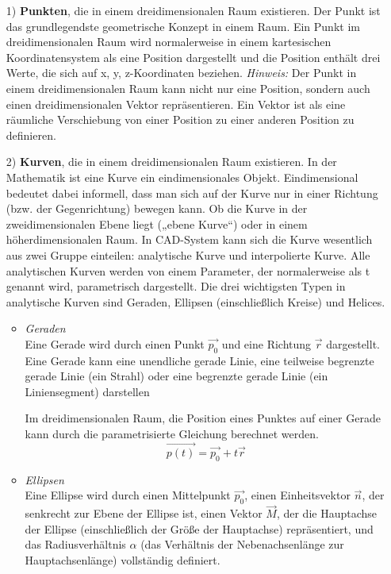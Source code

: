 \documentclass[14pt,a4paper,titlepage]{article}
\begin{document}
		\begin{itemize}
			\item[1)]
			\textbf{Punkten}, die in einem dreidimensionalen Raum existieren.
			\linebreak
			Der Punkt ist das grundlegendste geometrische Konzept in einem Raum. Ein Punkt im dreidimensionalen Raum wird normalerweise in einem kartesischen Koordinatensystem als eine Position dargestellt und die Position enthält drei Werte, die sich auf x, y, z-Koordinaten beziehen. 
			\bigbreak
			\emph{Hinweis:}
			\linebreak
			{\small Der Punkt in einem dreidimensionalen Raum kann nicht nur eine Position, sondern auch einen dreidimensionalen Vektor repräsentieren. Ein Vektor ist als eine räumliche Verschiebung von einer Position zu einer anderen Position zu definieren.}    
			\item[2)] 
			\textbf{Kurven}, die in einem dreidimensionalen Raum existieren.
			\linebreak
			In der Mathematik ist eine Kurve ein eindimensionales Objekt. Eindimensional bedeutet dabei informell, dass man sich auf der Kurve nur in einer Richtung (bzw. der Gegenrichtung) bewegen kann. Ob die Kurve in der zweidimensionalen Ebene liegt („ebene Kurve“) oder in einem höherdimensionalen Raum.\cite{kurve}
			\bigbreak
			In CAD-System kann sich die Kurve wesentlich aus zwei Gruppe einteilen: analytische Kurve und interpolierte Kurve.
			Alle analytischen Kurven werden von einem Parameter, der normalerweise als t genannt wird, parametrisch dargestellt. Die drei wichtigsten Typen in analytische Kurven sind Geraden, Ellipsen (einschließlich Kreise) und Helices.
			
			\begin{itemize}
				\item \emph{Geraden}
				\\
				Eine Gerade wird durch einen Punkt \(\vec{p_0}\) und eine Richtung \(\vec{r}\) dargestellt. Eine Gerade kann eine unendliche gerade Linie, eine teilweise begrenzte gerade Linie (ein Strahl) oder eine begrenzte gerade Linie (ein Liniensegment) darstellen
				
				\bigbreak
				
				Im dreidimensionalen Raum, die Position eines Punktes auf einer Gerade kann durch die parametrisierte Gleichung berechnet werden.
			    \[ \vec{p(t)} = \vec{p_0} + t\vec{r} \]
			    
				\item \emph{Ellipsen}
				\\
				Eine Ellipse wird durch einen Mittelpunkt \(\vec{p_0}\), einen Einheitsvektor \(\vec{n}\), der senkrecht zur Ebene der Ellipse ist, einen Vektor \(\vec{M}\), der die Hauptachse der Ellipse (einschließlich der Größe der Hauptachse) repräsentiert, und das Radiusverhältnis \(\alpha\) (das Verhältnis der Nebenachsenlänge zur Hauptachsenlänge) vollständig definiert.
				

\end{itemize}
\end{itemize}
\end{document}
